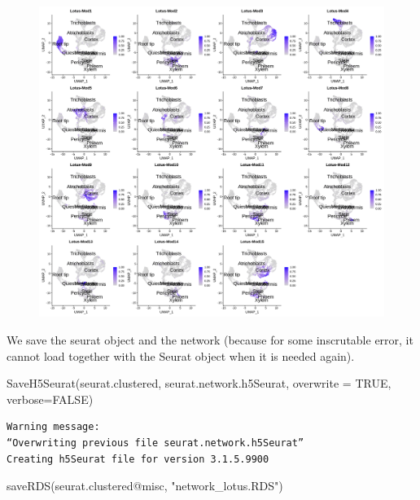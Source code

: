 \documentclass[
  letterpaper,
  DIV=11,
  numbers=noendperiod]{scrartcl}
\newenvironment{Shaded}{\begin{snugshade}}{\end{snugshade}}
\newcommand{\AttributeTok}[1]{\textcolor[rgb]{0.49,0.56,0.16}{#1}}
\newcommand{\ConstantTok}[1]{\textcolor[rgb]{0.53,0.00,0.00}{#1}}
\newcommand{\FunctionTok}[1]{\textcolor[rgb]{0.02,0.16,0.49}{#1}}
\newcommand{\NormalTok}[1]{\textcolor[rgb]{0.00,0.44,0.13}{#1}}
\newcommand{\SpecialCharTok}[1]{\textcolor[rgb]{0.25,0.44,0.63}{#1}}
\newcommand{\StringTok}[1]{\textcolor[rgb]{0.25,0.44,0.63}{#1}}
\begin{document}
\begin{figure}[H]

{\centering \includegraphics{notebook_files/figure-pdf/cell-134-output-3.png}

}

\end{figure}

We save the seurat object and the network (because for some inscrutable
error, it cannot load together with the Seurat object when it is needed
again).

\begin{Shaded}
\begin{Highlighting}[]
\FunctionTok{SaveH5Seurat}\NormalTok{(seurat.clustered, }\StringTok{\textquotesingle{}seurat.network.h5Seurat\textquotesingle{}}\NormalTok{, }\AttributeTok{overwrite =} \ConstantTok{TRUE}\NormalTok{, }\AttributeTok{verbose=}\ConstantTok{FALSE}\NormalTok{)}
\end{Highlighting}
\end{Shaded}

\begin{verbatim}
Warning message:
“Overwriting previous file seurat.network.h5Seurat”
Creating h5Seurat file for version 3.1.5.9900
\end{verbatim}

\begin{Shaded}
\begin{Highlighting}[]
\FunctionTok{saveRDS}\NormalTok{(seurat.clustered}\SpecialCharTok{@}\NormalTok{misc, }\StringTok{"network\_lotus.RDS"}\NormalTok{)}
\end{Highlighting}
\end{Shaded}
\end{document}
